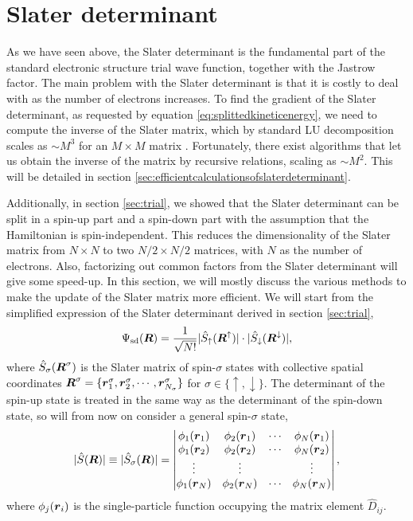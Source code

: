 \section{Slater determinant}
As we have seen above, the Slater determinant is the fundamental part of the standard electronic structure trial wave function, together with the Jastrow factor. The main problem with the Slater determinant is that it is costly to deal with as the number of electrons increases. To find the gradient of the Slater determinant, as requested by equation \eqref{eq:splittedkineticenergy}, we need to compute the inverse of the Slater matrix, which by standard LU decomposition scales as $\sim M^3$ for an $M\times M$ matrix \supercite{trahan_computational_2006}. Fortunately, there exist algorithms that let us obtain the inverse of the matrix by recursive relations, scaling as $\sim M^2$. This will be detailed in section \ref{sec:efficientcalculationsofslaterdeterminant}.

Additionally, in section \ref{sec:trial}, we showed that the Slater determinant can be split in a spin-up part and a spin-down part with the assumption that the Hamiltonian is spin-independent. This reduces the dimensionality of the Slater matrix from $N\times N$ to two $N/2\times N/2$ matrices, with $N$ as the number of electrons. Also, factorizing out common factors from the Slater determinant will give some speed-up. In this section, we will mostly discuss the various methods to make the update of the Slater matrix more efficient. We will start from the simplified expression of the Slater determinant derived in section \ref{sec:trial},
\begin{equation}
\Psi_{\text{sd}}(\boldsymbol{{R}})=\frac{1}{\sqrt{N!}}|\hat{S}_{\uparrow}(\boldsymbol{{R}}^{\uparrow})|\cdot|\hat{S}_{\downarrow}(\boldsymbol{{R}}^{\downarrow})|,
\end{equation}
where $\hat{S}_{\sigma}(\boldsymbol{{R}}^{\sigma})$ is the Slater matrix of spin-$\sigma$ states with collective spatial coordinates $\boldsymbol{{R}}^{\sigma}=\{\boldsymbol{{r}}_1^{\sigma},\boldsymbol{{r}}_2^{\sigma},\cdots,\boldsymbol{{r}}_{N_{\sigma}}^{\sigma}\}$ for $\sigma\in\{\uparrow, \downarrow\}$. The determinant of the spin-up state is treated in the same way as the determinant of the spin-down state, so will from now on consider a general spin-$\sigma$ state,
\begin{equation}
|\hat{S}(\boldsymbol{{R}})|\equiv|\hat{S}_{\sigma}(\boldsymbol{{R}})|=\begin{vmatrix}
\phi_1(\boldsymbol{r}_1) & \phi_2(\boldsymbol{r}_1) & \cdots & \phi_{N}(\boldsymbol{r}_1)\\
\phi_1(\boldsymbol{r}_2) & \phi_2(\boldsymbol{r}_2) & \cdots & \phi_{N}(\boldsymbol{r}_2)\\
\vdots & \vdots & & \vdots \\
\phi_1(\boldsymbol{r}_{N}) & \phi_2(\boldsymbol{r}_{N}) & \cdots & \phi_{N}(\boldsymbol{r}_{N})
\end{vmatrix},
\end{equation}
where $\phi_j(\boldsymbol{{r}}_i)$ is the single-particle function occupying the matrix element $\hat{D}_{ij}$.

